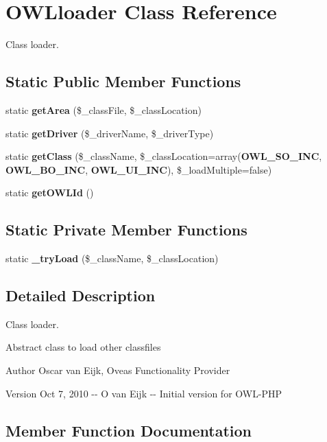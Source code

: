 \section{OWLloader Class Reference}
\label{classOWLloader}


Class loader.  


\subsection*{Static Public Member Functions}
\begin{DoxyCompactItemize}
\item 
static {\bf getArea} (\$\_\-classFile, \$\_\-classLocation)
\item 
static {\bf getDriver} (\$\_\-driverName, \$\_\-driverType)
\item 
static {\bf getClass} (\$\_\-className, \$\_\-classLocation=array({\bf OWL\_\-SO\_\-INC}, {\bf OWL\_\-BO\_\-INC}, {\bf OWL\_\-UI\_\-INC}), \$\_\-loadMultiple=false)
\item 
static {\bf getOWLId} ()
\end{DoxyCompactItemize}
\subsection*{Static Private Member Functions}
\begin{DoxyCompactItemize}
\item 
static {\bf \_\-tryLoad} (\$\_\-className, \$\_\-classLocation)
\end{DoxyCompactItemize}


\subsection{Detailed Description}
Class loader. 

Abstract class to load other classfiles \begin{DoxyAuthor}{Author}
Oscar van Eijk, Oveas Functionality Provider 
\end{DoxyAuthor}
\begin{DoxyVersion}{Version}
Oct 7, 2010 -\/-\/ O van Eijk -\/-\/ Initial version for OWL-\/PHP 
\end{DoxyVersion}


\subsection{Member Function Documentation}
